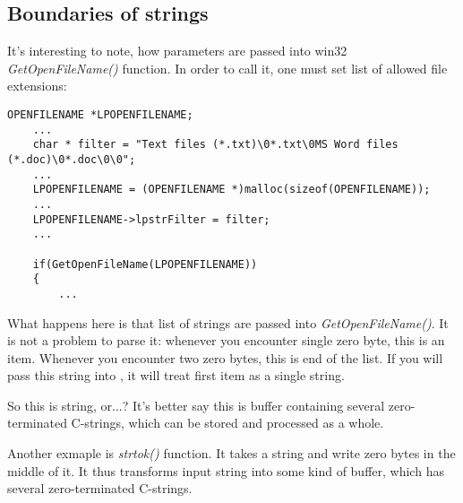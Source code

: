 \subsection{Boundaries of strings}

It's interesting to note, how parameters are passed into win32 \emph{GetOpenFileName()} function.
In order to call it, one must set list of allowed file extensions:

\begin{lstlisting}[style=customc]
	OPENFILENAME *LPOPENFILENAME;
	...
	char * filter = "Text files (*.txt)\0*.txt\0MS Word files (*.doc)\0*.doc\0\0";
	...
	LPOPENFILENAME = (OPENFILENAME *)malloc(sizeof(OPENFILENAME));
	...
	LPOPENFILENAME->lpstrFilter = filter;
	...

	if(GetOpenFileName(LPOPENFILENAME))
	{
		...
\end{lstlisting}

What happens here is that list of strings are passed into \emph{GetOpenFileName()}.
It is not a problem to parse it: whenever you encounter single zero byte, this is an item.
Whenever you encounter two zero bytes, this is end of the list.
If you will pass this string into \printf, it will treat first item as a single string.

So this is string, or...?
It's better say this is buffer containing several zero-terminated C-strings, which can be stored and processed
as a whole.

Another exmaple is \emph{strtok()} function. It takes a string and write zero bytes in the middle of it.
It thus transforms input string into some kind of buffer, which has several zero-terminated C-strings.

